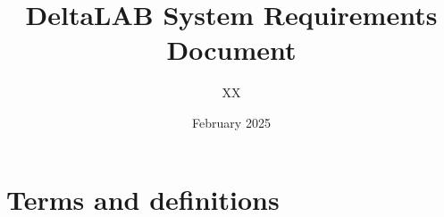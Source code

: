 \documentclass{article}
\title{DeltaLAB System Requirements Document}
\author{XX}
\date{February 2025}
\begin{document}
\maketitle

\section{Terms and definitions}
\end{document}
